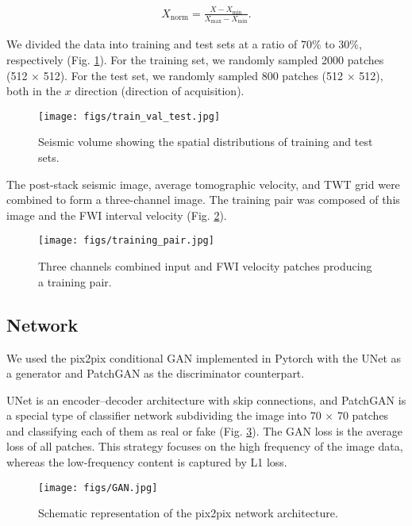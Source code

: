 \documentclass[conference]{IEEEtran}
\begin{document}
\begin{align}
     X_{\mathrm{norm}}  = \frac{X-X_{\mathrm{min}}}{X_{\mathrm{max}}-X_{\mathrm{min}}}. \label{eq:Norm}
\end{align}

We divided the data into training and test sets at a ratio of 70\% to 30\%, respectively (Fig. \ref{fig:train_val}). 
For the training set, we randomly sampled 2000 patches (512 × 512). For the test set, we randomly sampled 800 patches (512 × 512), both in the $x$ direction (direction of acquisition).

\begin{figure}[b]
 \centering
 \texttt{[image: figs/train\_val\_test.jpg]}
  \caption{Seismic volume showing the spatial distributions of training and test sets.}
 \label{fig:train_val}
\end{figure}

The post-stack seismic image, average tomographic velocity, and TWT grid were combined to form a three-channel image. The training pair was composed of this image and the FWI interval velocity (Fig. \ref{fig:training_pair}).

\begin{figure}[t]
 \centering
 \texttt{[image: figs/training\_pair.jpg]}
  \caption{Three channels combined input and FWI velocity patches producing a training pair.}
 \label{fig:training_pair}
\end{figure}

\subsection{Network}

We used the pix2pix conditional GAN implemented in Pytorch with the UNet \cite{Ronneberger2015UNetCN} as a generator and PatchGAN\cite{isola2018imagetoimage} as the discriminator counterpart.

UNet is an encoder--decoder architecture with skip connections, and PatchGAN is a special type of classifier network subdividing the image into 70 × 70 patches and classifying each of them as real or fake (Fig. \ref{fig:GAN}). The GAN loss is the average loss of all patches. This strategy focuses on the high frequency of the image data, whereas the low-frequency content is captured by L1 loss.


\begin{figure}[hb]
 \centering
 \texttt{[image: figs/GAN.jpg]}
  \caption{Schematic representation of the pix2pix network architecture.}
 \label{fig:GAN}
\end{figure}
\end{document}
